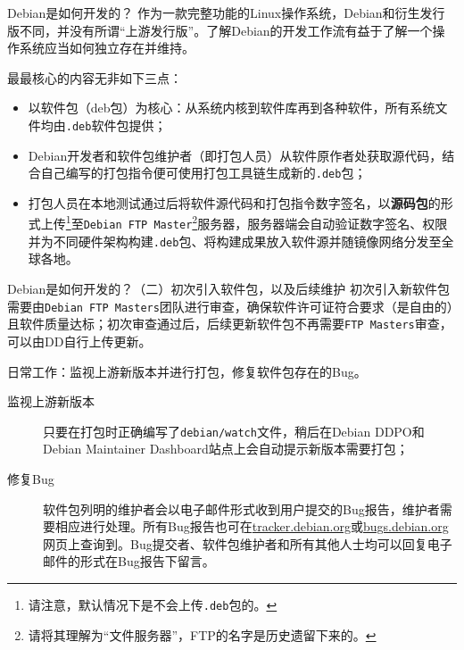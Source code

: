 
\begin{frame}{Debian是如何开发的？}
	作为一款完整功能的Linux操作系统，Debian和衍生发行版不同，并没有所谓“上游发行版”。了解Debian的开发工作流有益于了解一个操作系统应当如何独立存在并维持。
	
	\vfill
	
	最最核心的内容无非如下三点：
	
	\begin{itemize}
		\item 以软件包（deb包）为核心：从系统内核到软件库再到各种软件，所有系统文件均由\texttt{.deb}软件包提供；
		\item Debian开发者和软件包维护者（即打包人员）从软件原作者处获取源代码，结合自己编写的打包指令便可使用打包工具链生成新的\texttt{.deb}包；
		\item 打包人员在本地测试通过后将软件源代码和打包指令数字签名，以\textbf{源码包}的形式上传\footnote{请注意，默认情况下是不会上传\texttt{.deb}包的。}至\texttt{Debian FTP Master}\footnote{请将其理解为“文件服务器”，FTP的名字是历史遗留下来的。}服务器，服务器端会自动验证数字签名、权限并为不同硬件架构构建\texttt{.deb}包、将构建成果放入软件源并随镜像网络分发至全球各地。
	\end{itemize}
	
\end{frame}

\begin{frame}{Debian是如何开发的？（二）}{初次引入软件包，以及后续维护}
	初次引入新软件包需要由\texttt{Debian FTP Masters}团队进行审查，确保软件许可证符合要求（是自由的）且软件质量达标；初次审查通过后，后续更新软件包不再需要\texttt{FTP Masters}审查，可以由DD自行上传更新。
	
	\vfill
	
	日常工作：监视上游新版本并进行打包，修复软件包存在的Bug。
	\begin{description}
		\item[监视上游新版本] 只要在打包时正确编写了\texttt{debian/watch}文件，稍后在Debian DDPO和Debian Maintainer Dashboard站点上会自动提示新版本需要打包；
		\item[修复Bug] 软件包列明的维护者会以电子邮件形式收到用户提交的Bug报告，维护者需要相应进行处理。所有Bug报告也可在\url{tracker.debian.org}或\url{bugs.debian.org}网页上查询到。Bug提交者、软件包维护者和所有其他人士均可以回复电子邮件的形式在Bug报告下留言。
	\end{description}
\end{frame}

